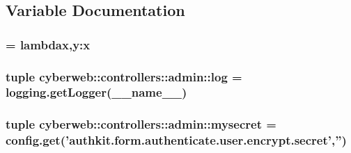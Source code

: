 \subsection{\-Variable \-Documentation}
\hypertarget{namespacecyberweb_1_1controllers_1_1admin_abf2604aa92a83ca421e67845eef74b29}{
\subsubsection[{encrypt}]{ = lambdax,y\-:x}}\label{namespacecyberweb_1_1controllers_1_1admin_abf2604aa92a83ca421e67845eef74b29}
\hypertarget{namespacecyberweb_1_1controllers_1_1admin_acbcde37e994bb3b1f4f2ae704ce6ba52}{
\subsubsection[{log}]{\setlength{\rightskip}{0pt plus 5cm}tuple {\bf cyberweb\-::controllers\-::admin\-::log} = logging.\-get\-Logger(\-\_\-\-\_\-name\-\_\-\-\_\-)}}\label{namespacecyberweb_1_1controllers_1_1admin_acbcde37e994bb3b1f4f2ae704ce6ba52}
\hypertarget{namespacecyberweb_1_1controllers_1_1admin_a36d13af11780771fa08c7fca0b10074b}{
\subsubsection[{mysecret}]{\setlength{\rightskip}{0pt plus 5cm}tuple {\bf cyberweb\-::controllers\-::admin\-::mysecret} = config.\-get('authkit.\-form.\-authenticate.\-user.\-encrypt.\-secret','')}}\label{namespacecyberweb_1_1controllers_1_1admin_a36d13af11780771fa08c7fca0b10074b}
